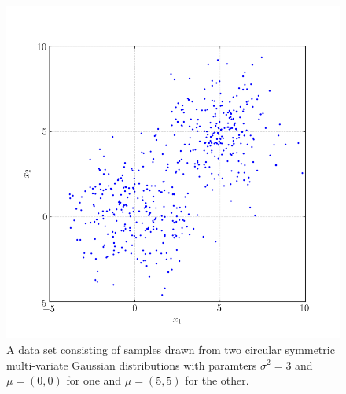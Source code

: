 \documentclass[conference]{IEEEtran}
\begin{document}
\begin{figure}[p!]
\centerline{\includegraphics[trim=0 0 0 0, clip, width=\columnwidth]{Figure_1.png}}
\caption{A data set consisting of samples drawn from two circular symmetric multi-variate Gaussian distributions with paramters $\sigma^2=3$ and $\mu=(0,0)$ for one and $\mu=(5,5)$ for the other.}
\label{fig:circgauss}
\end{figure}
\end{document}
